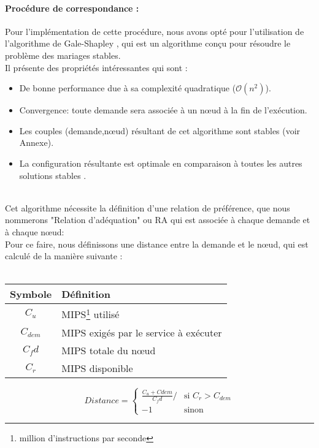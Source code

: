 \paragraph{Procédure de correspondance :}
Pour l'implémentation de cette procédure, nous avons opté pour l'utilisation de l'algorithme de Gale-Shapley \cite{gale-shapley}, qui est un algorithme conçu pour résoudre le problème des mariages stables.\\
Il présente des propriétés intéressantes qui sont :
\begin{itemize}
  \item De bonne performance due à sa complexité quadratique ($\mathcal{O}(n^2)$).
    \item Convergence: toute demande sera associée à un nœud à la fin de l'exécution.
    \item Les couples (demande,nœud) résultant de cet algorithme sont stables (voir Annexe).
    \item La configuration résultante est optimale en comparaison à toutes les autres solutions stables \cite{gale-shapley}.
\end{itemize} \\
Cet algorithme nécessite la définition d'une relation de préférence, que nous nommerons "Relation d'adéquation" ou RA qui est associée à chaque demande et à chaque nœud:\\
Pour ce faire, nous définissons une distance entre la demande et le nœud, qui est calculé de la manière suivante :
\\ \\
\begin{minipage}[t]{0.4\textwidth}
\begin{flushleft}
    \begin{tabular}{| c | p{4cm}|}
    \hline
    Symbole & Définition \\
    \hline
    $C_u$ & MIPS\footnote{million d'instructions par seconde} utilisé \\ 
    \hline
    $C_{dem}$ & MIPS exigés par le service à exécuter \\
    \hline
    $C_fd$ & MIPS totale du nœud \\
    \hline
    $C_r$ & MIPS disponible \\
    \hline
    \end{tabular}
\end{flushleft}
\end{minipage}
%
\begin{minipage}[th]{0.4\textwidth}
\begin{flushright} 
\begin{center}
    $$Distance =\left \lbrace 
    \begin{array}{ll}
        \frac{C_u + Cdem}{C_fd}/ & \mbox{si $C_r > C_{dem}$}\\
        -1 & \mbox{sinon}
    \end{array}
\right.$$
\end{center}
\end{flushright}
\end{minipage}
